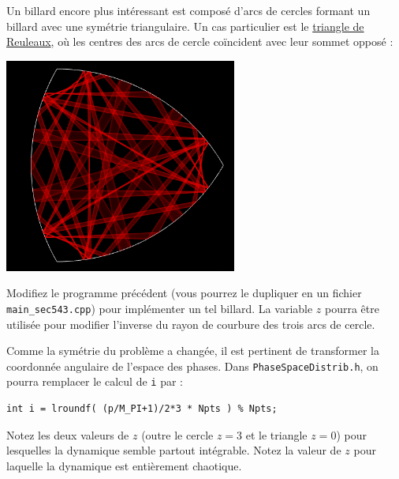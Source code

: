 \documentclass{book}
\newcommand{\inline}[1]{\texttt{#1}}
\def\filename{\texttt}
\begin{document}
Un billard encore plus intéressant est composé d'arcs de cercles formant un billard avec une symétrie triangulaire. Un cas particulier est le \href{https://fr.wikipedia.org/wiki/Triangle_de_Reuleaux}{triangle de Reuleaux}, où les centres des arcs de cercle coïncident avec leur sommet opposé :
\begin{center}
  \includegraphics[height=19em]{TD5bis/triangle-reuleaux.png}
\end{center}

Modifiez le programme précédent (vous pourrez le dupliquer en un fichier \inline{main_sec543.cpp}) pour implémenter un tel billard. La variable $z$ pourra être utilisée pour modifier l'inverse du rayon de courbure des trois arcs de cercle.

Comme la symétrie du problème a changée, il est pertinent de transformer la coordonnée angulaire de l'espace des phases. Dans \filename{PhaseSpaceDistrib.h}, on pourra remplacer le calcul de \inline{i} par :
\begin{verbatim}
int i = lroundf( (p/M_PI+1)/2*3 * Npts ) % Npts;
\end{verbatim}

Notez les deux valeurs de $z$ (outre le cercle $z=3$ et le triangle $z=0$) pour lesquelles la dynamique semble partout intégrable. Notez la valeur de $z$ pour laquelle la dynamique est entièrement chaotique.
\end{document}
